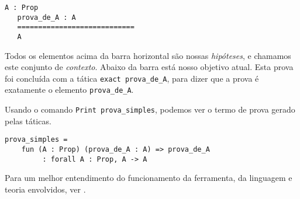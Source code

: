 \begin{lstlisting}[basicstyle=\small]
   A : Prop
   prova_de_A : A
   ============================
   A
\end{lstlisting}

Todos os elementos acima da barra horizontal são nossas \emph{hipóteses}, e
chamamos este conjunto de \emph{contexto}. Abaixo da barra está nosso objetivo
atual. Esta prova foi concluída com a tática \texttt{exact prova\_de\_A}, para
dizer que a prova é exatamente o elemento \texttt{prova\_de\_A}. 

Usando o comando \texttt{Print prova\_simples}, podemos ver o termo de prova
gerado pelas táticas.

\begin{lstlisting}[basicstyle=\small]
prova_simples = 
    fun (A : Prop) (prova_de_A : A) => prova_de_A
         : forall A : Prop, A -> A

\end{lstlisting}

Para um melhor entendimento do funcionamento da ferramenta, da linguagem e
teoria envolvidos, ver \cite{pierce}.
